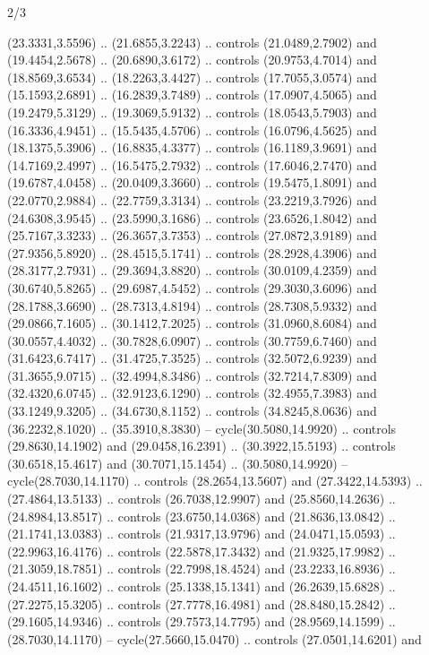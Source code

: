 \begin{flagdescription}{2/3}
\begin{scope}[yshift=\flagwidth,scale=\flagwidth/1241.93737]
\begin{scope}[y=-1mm, x=1mm,draw=gold,fill=blue,line join=miter,miter limit=4,line width=1.8\lw]
\begin{scope}[y=1mm, x=1mm, yscale=-1,shift={(573.68mm+\str,145.75)}]
\begin{scope}[scale=1.35,shift={(-9,-3)}]
\begin{scope}[scale=0.55]
\begin{scope}[scale=1.333]
    (23.3331,3.5596) .. (21.6855,3.2243) .. controls (21.0489,2.7902) and
    (19.4454,2.5678) .. (20.6890,3.6172) .. controls (20.9753,4.7014) and
    (18.8569,3.6534) .. (18.2263,3.4427) .. controls (17.7055,3.0574) and
    (15.1593,2.6891) .. (16.2839,3.7489) .. controls (17.0907,4.5065) and
    (19.2479,5.3129) .. (19.3069,5.9132) .. controls (18.0543,5.7903) and
    (16.3336,4.9451) .. (15.5435,4.5706) .. controls (16.0796,4.5625) and
    (18.1375,5.3906) .. (16.8835,4.3377) .. controls (16.1189,3.9691) and
    (14.7169,2.4997) .. (16.5475,2.7932) .. controls (17.6046,2.7470) and
    (19.6787,4.0458) .. (20.0409,3.3660) .. controls (19.5475,1.8091) and
    (22.0770,2.9884) .. (22.7759,3.3134) .. controls (23.2219,3.7926) and
    (24.6308,3.9545) .. (23.5990,3.1686) .. controls (23.6526,1.8042) and
    (25.7167,3.3233) .. (26.3657,3.7353) .. controls (27.0872,3.9189) and
    (27.9356,5.8920) .. (28.4515,5.1741) .. controls (28.2928,4.3906) and
    (28.3177,2.7931) .. (29.3694,3.8820) .. controls (30.0109,4.2359) and
    (30.6740,5.8265) .. (29.6987,4.5452) .. controls (29.3030,3.6096) and
    (28.1788,3.6690) .. (28.7313,4.8194) .. controls (28.7308,5.9332) and
    (29.0866,7.1605) .. (30.1412,7.2025) .. controls (31.0960,8.6084) and
    (30.0557,4.4032) .. (30.7828,6.0907) .. controls (30.7759,6.7460) and
    (31.6423,6.7417) .. (31.4725,7.3525) .. controls (32.5072,6.9239) and
    (31.3655,9.0715) .. (32.4994,8.3486) .. controls (32.7214,7.8309) and
    (32.4320,6.0745) .. (32.9123,6.1290) .. controls (32.4955,7.3983) and
    (33.1249,9.3205) .. (34.6730,8.1152) .. controls (34.8245,8.0636) and
    (36.2232,8.1020) .. (35.3910,8.3830) -- cycle(30.5080,14.9920) .. controls
    (29.8630,14.1902) and (29.0458,16.2391) .. (30.3922,15.5193) .. controls
    (30.6518,15.4617) and (30.7071,15.1454) .. (30.5080,14.9920) --
    cycle(28.7030,14.1170) .. controls (28.2654,13.5607) and (27.3422,14.5393) ..
    (27.4864,13.5133) .. controls (26.7038,12.9907) and (25.8560,14.2636) ..
    (24.8984,13.8517) .. controls (23.6750,14.0368) and (21.8636,13.0842) ..
    (21.1741,13.0383) .. controls (21.9317,13.9796) and (24.0471,15.0593) ..
    (22.9963,16.4176) .. controls (22.5878,17.3432) and (21.9325,17.9982) ..
    (21.3059,18.7851) .. controls (22.7998,18.4524) and (23.2233,16.8936) ..
    (24.4511,16.1602) .. controls (25.1338,15.1341) and (26.2639,15.6828) ..
    (27.2275,15.3205) .. controls (27.7778,16.4981) and (28.8480,15.2842) ..
    (29.1605,14.9346) .. controls (29.7573,14.7795) and (28.9569,14.1599) ..
    (28.7030,14.1170) -- cycle(27.5660,15.0470) .. controls (27.0501,14.6201) and

\end{scope}
\end{scope}
\end{scope}
\end{scope}
\end{scope}
\end{scope}
\end{flagdescription}
